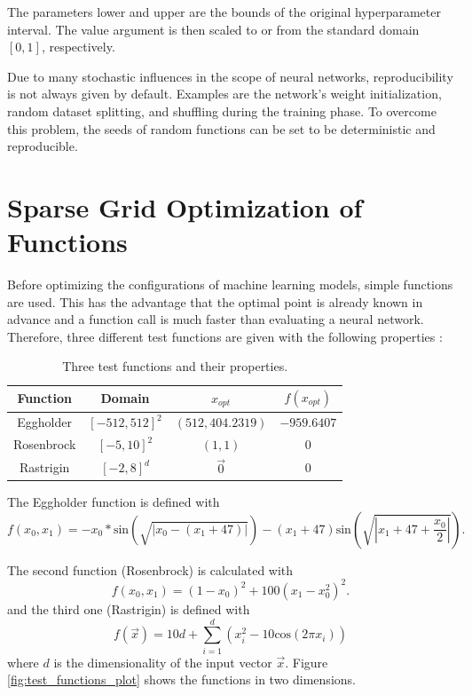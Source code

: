 The parameters lower and upper are the bounds of the original hyperparameter interval. The value argument is then scaled to or from the standard domain $ [0,1] $, respectively. \newline 

Due to many stochastic influences in the scope of neural networks, reproducibility is not always given by default. Examples are the network's weight initialization, random dataset splitting, and shuffling during the training phase. To overcome this problem, the seeds of random functions can be set to be deterministic and reproducible.


\section{Sparse Grid Optimization of Functions}

Before optimizing the configurations of machine learning models, simple functions are used. This has the advantage that the optimal point is already known in advance and a function call is much faster than evaluating a neural network. Therefore, three different test functions are given with the following properties \cite{valentin2016hierarchical}:

\begin{table}[H]
	\caption{ Three test functions and their properties.}
	\label{tab:test_functions}
	\centering
	\begin{tabular}{|c c c c|} 
		\hline
		Function & Domain & $x_{opt}$ & $ f(x_{opt}) $\\
		\hline
		Eggholder & $[-512, 512]^2 $ & $(512, 404.2319)$ & $ -959.6407 $ \\
		Rosenbrock & $[-5, 10]^2 $ & $(1,1)$ & $ 0 $ \\
		Rastrigin & $[-2, 8]^d $ & $\vec{0}$ & $ 0 $ \\
		\hline
	\end{tabular}
\end{table}

The Eggholder function is defined with \cite{whitley1996evaluating} 
\begin{equation}
	f(x_0, x_1) = -x_0 * \text{sin}(\sqrt{ | x_0 - (x_1 + 47) | }) - (x_1 + 47) \text{sin}(\sqrt{ | x_1 +47 + \frac{x_0}{2} | }).
\end{equation}

The second function (Rosenbrock) \cite{yang2010engineering} is calculated with 
\begin{equation}
	f(x_0, x_1) = (1-x_0)^2 + 100 (x_1 - x_0^2)^2.
\end{equation} 
and the third one (Rastrigin) \cite{yang2010engineering} is defined with
\begin{equation}
	f(\vec{x}) = 10 d + \sum_{ i = 1 }^{d} (x_i^2 - 10 \text{cos}(2 \pi x_i))
\end{equation} 
where $ d $ is the dimensionality of the input vector $ \vec{x} $. Figure \ref{fig:test_functions_plot} shows the functions in two dimensions.


